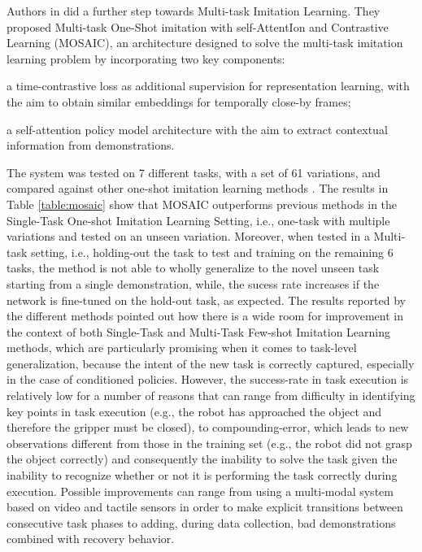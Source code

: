 Authors in \cite{mandi2022towards_more_generalizable_one_shot} did a further step towards Multi-task Imitation Learning. They proposed Multi-task One-Shot imitation with self-AttentIon and Contrastive Learning (MOSAIC), an architecture designed to solve the multi-task imitation learning problem by incorporating two key components: \begin{enumerate*}[label=\textbf{(\arabic*)}]
    \item a time-contrastive loss as additional supervision for representation learning, with the aim to obtain similar embeddings for temporally close-by frames;
    \item a self-attention policy model architecture with the aim to extract contextual information from demonstrations.
\end{enumerate*} The system was tested on 7 different tasks, with a set of 61 variations, and compared against other one-shot imitation learning methods \cite{yu2018daml,dasari2021transformers_one_shot}. The results in Table \ref{table:mosaic} show that MOSAIC outperforms previous methods in the Single-Task One-shot Imitation Learning Setting, i.e., one-task with multiple variations and tested on an unseen variation. Moreover, when tested in a Multi-task setting, i.e., holding-out the task to test and training on the remaining 6 tasks, the method is not able to wholly generalize to the novel unseen task starting from a single demonstration, while, the sucess rate increases if the network is fine-tuned on the hold-out task, as expected. The results reported by the different methods pointed out how there is a wide room for improvement in the context of both Single-Task and Multi-Task Few-shot Imitation Learning methods, which are particularly promising when it comes to task-level generalization, because the intent of the new task is correctly captured, especially in the case of conditioned policies. However, the success-rate in task execution is relatively low for a number of reasons that can range from difficulty in identifying key points in task execution (e.g., the robot has approached the object and therefore the gripper must be closed), to compounding-error, which leads to new observations different from those in the training set (e.g., the robot did not grasp the object correctly) and consequently the inability to solve the task given the inability to recognize whether or not it is performing the task correctly during execution. Possible improvements can range from using a multi-modal system based on video and tactile sensors in order to make explicit transitions between consecutive task phases to adding, during data collection, bad demonstrations combined with recovery behavior. 
